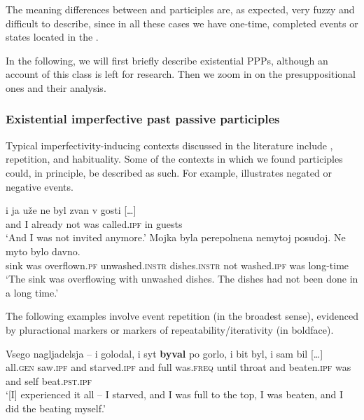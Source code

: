 \documentclass[output=paper,modfonts,newtxmath,hidelinks
\ChapterDOI{10.5281/zenodo.2545513}
]{langscibook}
\begin{document}
\noindent The meaning differences between  and  participles are, as expected, very fuzzy and difficult to describe, since in all these cases we have one-time, completed events or states located in the . 

In the following,  we will first briefly describe existential  PPPs, although an account of this class is left for  research. Then we  zoom in on the presuppositional ones and their analysis.

\subsubsection{Existential imperfective past passive participles}

Typical imperfectivity-inducing contexts discussed in the literature include , repetition, and habituality. Some of the contexts in which we found  participles could, in principle, be described as such. For example,  illustrates negated or negative events. 

\ea\label{negOF}
\ea\gll	[\dots] i ja uže ne byl zvan v gosti [\dots]\\
	{} and I already not was called.\textsc{ipf} in guests \\
\glt `And I was not invited anymore.' 
\ex\gll	Mojka byla perepolnena nemytoj posudoj. Ne myto bylo davno.\\
   	sink was overflown.\textsc{pf} unwashed.\textsc{instr} dishes.\textsc{instr} not washed.\textsc{ipf} was long-time\\
\glt	`The sink was overflowing with unwashed dishes. The dishes had not been done in a long time.'\label{17c}
\z\z

\noindent The following examples involve event repetition (in the broadest sense), evidenced by pluractional markers  or markers of repeatability/iterativity  (in boldface).

\ea\gll	Vsego nagljadelsja -- i golodal, i syt \textbf{byval} po gorlo, i bit byl, i sam bil [\dots] \label{golodal}\\
	all.\textsc{gen} saw.\textsc{ipf} {} and starved.\textsc{ipf} and full was.\textsc{freq} until throat and beaten.\textsc{ipf} was and self beat.\textsc{pst}.\textsc{ipf}\\
\glt	`[I] experienced it all -- I starved, and I was full to the top, I was beaten, and I did the beating myself.'\label{bit} 
\z
\end{document}
